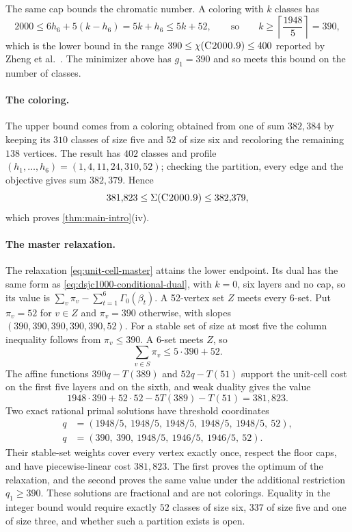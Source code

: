 \documentclass[11pt]{article}
\theoremstyle{definition}
\newcommand{\CTwoThousand}{\textnormal{\textsc{C2000.9}}}
\begin{document}
The same cap bounds the chromatic number. A coloring with $k$ classes has
\[
  2000\le6h_6+5(k-h_6)=5k+h_6\le5k+52,
  \qquad\text{so}\qquad k\ge\left\lceil\frac{1948}{5}\right\rceil=390,
\]
which is the lower bound in the range $390\le\chi(\CTwoThousand)\le400$
reported by Zheng et al.~\cite[Table~EC.2]{zheng2026}. The minimizer above
has $g_1=390$ and so meets this bound on the number of classes.

\paragraph{The coloring.} The upper bound comes from a coloring obtained from
one of sum $382{,}384$ by keeping its $310$ classes of size five and $52$ of
size six and recoloring the remaining $138$ vertices. The result has $402$
classes and profile $(h_1,\ldots,h_6)=(1,4,11,24,310,52)$; checking the
partition, every edge and the objective gives sum $382{,}379$. Hence
\begin{equation}
  381{,}823\le\Sigma(\CTwoThousand)\le382{,}379,
  \label{eq:c2000-interval}
\end{equation}
which proves \cref{thm:main-intro}(iv).

\paragraph{The master relaxation.} The relaxation \eqref{eq:unit-cell-master}
attains the lower endpoint. Its dual has the same form as
\eqref{eq:dsjc1000-conditional-dual}, with $k=0$, six layers and no cap, so
its value is $\sum_v\pi_v-\sum_{t=1}^{6}\Gamma_0(\beta_t)$. A 52-vertex set
$Z$ meets every 6-set. Put $\pi_v=52$ for $v\in Z$ and $\pi_v=390$
otherwise, with slopes $(390,390,390,390,390,52)$. For a stable set of size
at most five the column inequality follows from $\pi_v\le390$. A 6-set meets
$Z$, so
\[
  \sum_{v\in S}\pi_v\le5\cdot390+52.
\]
The affine functions $390q-T(389)$ and $52q-T(51)$ support the unit-cell
cost on the first five layers and on the sixth, and weak duality gives the
value
\[
  1948\cdot390+52\cdot52-5T(389)-T(51)=381{,}823.
\]
Two exact rational primal solutions have threshold coordinates
\begin{align*}
  q&=(1948/5,\ 1948/5,\ 1948/5,\ 1948/5,\ 1948/5,\ 52),\\
  q&=(390,\ 390,\ 1948/5,\ 1946/5,\ 1946/5,\ 52).
\end{align*}
Their stable-set weights cover every vertex exactly once, respect the floor
caps, and have piecewise-linear cost $381{,}823$. The first proves the
optimum of the relaxation, and the second proves the same value under the
additional restriction $q_1\ge390$. These solutions are fractional and are
not colorings. Equality in the integer bound would require exactly $52$
classes of size six, $337$ of size five and one of size three, and whether
such a partition exists is open.
\end{document}
